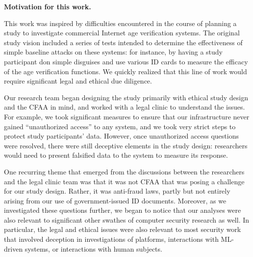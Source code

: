 \textbf{Motivation for this work.}
\label{sec:motivation}

This work was inspired by difficulties encountered in the course of planning a study to investigate commercial Internet age verification systems. 
The original study vision included a series of tests intended to determine the effectiveness of simple baseline attacks on these systems: for instance, by having a study participant don simple disguises and use various ID cards to measure the efficacy of the age verification functions. We quickly realized that this line of work would require significant legal and ethical due diligence.

Our research team began designing the study primarily with ethical study design and the CFAA in mind, and worked with a legal clinic to understand the issues. For example, we took significant measures to ensure that our infrastructure never gained ``unauthorized access'' to any system, and we took very strict steps to protect study participants' data. However, once unauthorized access questions were resolved, there were still deceptive elements in the study design: researchers would need to present falsified data to the system to measure its response. 

One recurring theme that emerged from the discussions between the researchers and the legal clinic team was that it was not CFAA that was posing a challenge for our study design.  Rather, it was anti-fraud laws, partly but not entirely arising from our use of government-issued ID documents.
Moreover, as we investigated these questions further, we began to notice that our analyses were
also relevant to significant other swathes of computer security research as well. In particular, the legal and ethical issues were also relevant to most security work that involved deception in investigations of platforms, interactions with ML-driven systems, or interactions with human subjects.



 

